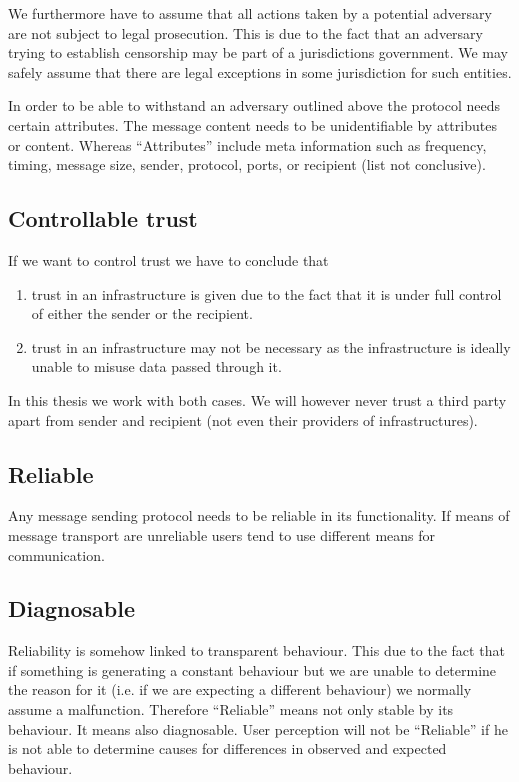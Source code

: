 We furthermore have to assume that all actions taken by a potential adversary are not subject to legal prosecution. This is due to the fact that an adversary trying to establish censorship may be part of a jurisdictions government. We may safely assume that there are legal exceptions in some jurisdiction for such entities.

In order to be able to withstand an adversary outlined above the protocol needs certain attributes. The message content needs to be unidentifiable by attributes or content. Whereas ``Attributes'' include meta information such as frequency, timing, message size, sender, protocol, ports, or recipient (list not conclusive).

\subsection{Controllable trust}
If we want to control trust we have to conclude that
\begin{enumerate}
	\item trust in an infrastructure is given due to the fact that it is under full control of either the sender or the recipient.
	\item trust in an infrastructure may not be necessary as the infrastructure is ideally unable to misuse data passed through it.
\end{enumerate}
In this thesis we work with both cases. We will however never trust a third party apart from sender and recipient (not even their providers of infrastructures).

\subsection{Reliable}
Any message sending protocol needs to be reliable in its functionality. If means of message transport are unreliable users tend to use different means for communication. 

\subsection{Diagnosable}
Reliability is somehow linked to transparent behaviour. This due to the fact that if something is generating a constant behaviour but we are unable to determine the reason for it (i.e. if we are expecting a different behaviour) we normally assume a malfunction. Therefore ``Reliable'' means not only stable by its behaviour. It means also diagnosable. User perception will not be ``Reliable'' if he is not able to determine causes for differences in observed and expected behaviour.

